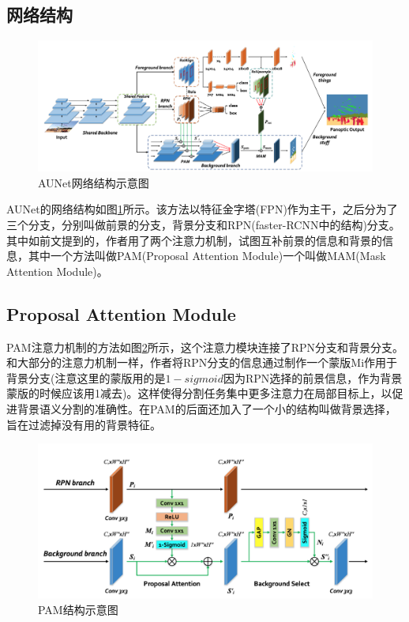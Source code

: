 \documentclass[cn]{elegantbook}
\begin{document}
\subsection{网络结构}

\begin{figure}[h]
	\centering
	\includegraphics[width=\textwidth]{images/aunet}
	\caption{\label{aunet}AUNet网络结构示意图}
\end{figure}

AUNet的网络结构如图\ref{aunet}所示。该方法以特征金字塔(FPN)作为主干，之后分为了三个分支，分别叫做前景的分支，背景分支和RPN(faster-RCNN中的结构)分支。其中如前文提到的，作者用了两个注意力机制，试图互补前景的信息和背景的信息，其中一个方法叫做PAM(Proposal Attention Module)一个叫做MAM(Mask Attention Module)。

\subsection{Proposal Attention Module}
PAM注意力机制的方法如图\ref{pam}所示，这个注意力模块连接了RPN分支和背景分支。和大部分的注意力机制一样，作者将RPN分支的信息通过制作一个蒙版Mi作用于背景分支(注意这里的蒙版用的是$1-sigmoid$因为RPN选择的前景信息，作为背景蒙版的时候应该用1减去)。这样使得分割任务集中更多注意力在局部目标上，以促进背景语义分割的准确性。在PAM的后面还加入了一个小的结构叫做背景选择，旨在过滤掉没有用的背景特征。
\begin{figure}[h]
	\centering
	\includegraphics[width=\textwidth]{images/pam}
	\caption{\label{pam}PAM结构示意图}
\end{figure}
\end{document}
